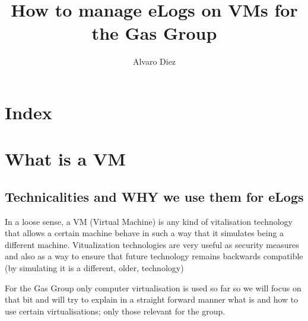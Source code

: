 \documentclass[runningheads,a4paper]{llncs}
\begin{document}
\mainmatter 

\title{How to manage eLogs on VMs for the Gas Group}


\author{Alvaro Diez}



\tocauthor{{}}

\maketitle

\begin{abstract}
\end{abstract}
\newpage

\medskip

\begingroup
\let\clearpage\relax
\tableofcontents
\newpage
{}
\endgroup

\medskip
\medskip
\section*{Index}

\section{What is a VM}



\subsection{Technicalities and WHY we use them for eLogs}

In a loose sense, a VM (Virtual Machine) is any kind of vitalisation technology that allows a certain machine behave in such a way that it simulates being a different machine. Vitualization technologies are very useful as security measures and also as a way to ensure that future technology remains backwards compatible (by simulating it is a different, older, technology) 

For the Gas Group only computer virtualisation is  used so far so we will focus on that bit and will try to explain in a straight forward manner what is and how to use certain virtualisations; only those relevant for the group.
\end{document}
